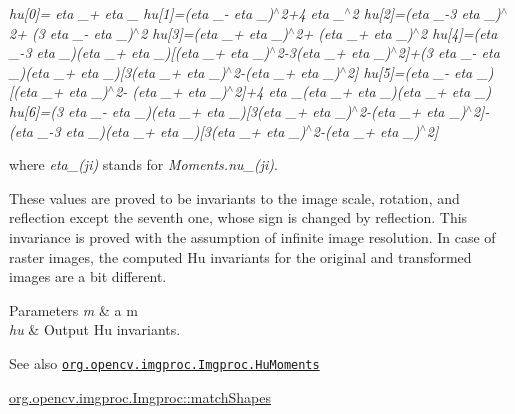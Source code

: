 {\itshape hu\mbox{[}0\mbox{]}= eta \+\_+ eta \+\_ hu\mbox{[}1\mbox{]}=(eta \+\_-\/ eta \+\_)$^\wedge$2+4 eta \+\_$^\wedge$2 hu\mbox{[}2\mbox{]}=(eta \+\_-\/3 eta \+\_)$^\wedge$2+ (3 eta \+\_-\/ eta \+\_)$^\wedge$2 hu\mbox{[}3\mbox{]}=(eta \+\_+ eta \+\_)$^\wedge$2+ (eta \+\_+ eta \+\_)$^\wedge$2 hu\mbox{[}4\mbox{]}=(eta \+\_-\/3 eta \+\_)(eta \+\_+ eta \+\_)\mbox{[}(eta \+\_+ eta \+\_)$^\wedge$2-\/3(eta \+\_+ eta \+\_)$^\wedge$2\mbox{]}+(3 eta \+\_-\/ eta \+\_)(eta \+\_+ eta \+\_)\mbox{[}3(eta \+\_+ eta \+\_)$^\wedge$2-\/(eta \+\_+ eta \+\_)$^\wedge$2\mbox{]} hu\mbox{[}5\mbox{]}=(eta \+\_-\/ eta \+\_)\mbox{[}(eta \+\_+ eta \+\_)$^\wedge$2-\/ (eta \+\_+ eta \+\_)$^\wedge$2\mbox{]}+4 eta \+\_(eta \+\_+ eta \+\_)(eta \+\_+ eta \+\_) hu\mbox{[}6\mbox{]}=(3 eta \+\_-\/ eta \+\_)(eta \+\_+ eta \+\_)\mbox{[}3(eta \+\_+ eta \+\_)$^\wedge$2-\/(eta \+\_+ eta \+\_)$^\wedge$2\mbox{]}-\/(eta \+\_-\/3 eta \+\_)(eta \+\_+ eta \+\_)\mbox{[}3(eta \+\_+ eta \+\_)$^\wedge$2-\/(eta \+\_+ eta \+\_)$^\wedge$2\mbox{]} }

where {\itshape eta\+\_\+(ji)} stands for {\itshape Moments.\+nu\+\_\+(ji)}.

These values are proved to be invariants to the image scale, rotation, and reflection except the seventh one, whose sign is changed by reflection. This invariance is proved with the assumption of infinite image resolution. In case of raster images, the computed Hu invariants for the original and transformed images are a bit different.


\begin{DoxyParams}{Parameters}
{\em m} & a m \\
\hline
{\em hu} & Output Hu invariants.\\
\hline
\end{DoxyParams}
\begin{DoxySeeAlso}{See also}
\href{http://docs.opencv.org/modules/imgproc/doc/structural_analysis_and_shape_descriptors.html#humoments}{\tt org.\+opencv.\+imgproc.\+Imgproc.\+Hu\+Moments} 

\mbox{\hyperlink{classorg_1_1opencv_1_1imgproc_1_1_imgproc_a615b8e00934e682b9f0fa511996b4434}{org.\+opencv.\+imgproc.\+Imgproc\+::match\+Shapes}} 
\end{DoxySeeAlso}
\mbox{\label{classorg_1_1opencv_1_1imgproc_1_1_imgproc_ae7ecce50c4e0db8881a8a59a02a3fdf3}} 
